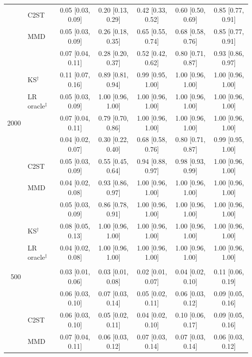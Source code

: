 \begin{tabular}{rlccccc}
 & C2ST & 0.05 [0.03, 0.09] & 0.20 [0.13, 0.29] & 0.42 [0.33, 0.52] & 0.60 [0.50, 0.69] & 0.85 [0.77, 0.91] \\
 & MMD & 0.05 [0.03, 0.09] & 0.26 [0.18, 0.35] & 0.65 [0.55, 0.74] & 0.68 [0.58, 0.76] & 0.85 [0.77, 0.91] \\
 & \SigMMD{} & 0.07 [0.04, 0.11] & 0.28 [0.20, 0.37] & 0.52 [0.42, 0.62] & 0.80 [0.71, 0.87] & 0.93 [0.86, 0.97] \\
 & KS$^{\dagger}$ & 0.11 [0.07, 0.16] & 0.89 [0.81, 0.94] & 0.99 [0.95, 1.00] & 1.00 [0.96, 1.00] & 1.00 [0.96, 1.00] \\
 & LR oracle$^{\ddagger}$ & 0.05 [0.03, 0.09] & 1.00 [0.96, 1.00] & 1.00 [0.96, 1.00] & 1.00 [0.96, 1.00] & 1.00 [0.96, 1.00] \\
2000 & \WC{} & 0.07 [0.04, 0.11] & 0.79 [0.70, 0.86] & 1.00 [0.96, 1.00] & 1.00 [0.96, 1.00] & 1.00 [0.96, 1.00] \\
 & \LRC{} & 0.04 [0.02, 0.07] & 0.30 [0.22, 0.40] & 0.68 [0.58, 0.76] & 0.80 [0.71, 0.87] & 0.99 [0.95, 1.00] \\
 & C2ST & 0.05 [0.03, 0.09] & 0.55 [0.45, 0.64] & 0.94 [0.88, 0.97] & 0.98 [0.93, 0.99] & 1.00 [0.96, 1.00] \\
 & MMD & 0.04 [0.02, 0.08] & 0.93 [0.86, 0.97] & 1.00 [0.96, 1.00] & 1.00 [0.96, 1.00] & 1.00 [0.96, 1.00] \\
 & \SigMMD{} & 0.05 [0.03, 0.09] & 0.86 [0.78, 0.91] & 1.00 [0.96, 1.00] & 1.00 [0.96, 1.00] & 1.00 [0.96, 1.00] \\
 & KS$^{\dagger}$ & 0.08 [0.05, 0.13] & 1.00 [0.96, 1.00] & 1.00 [0.96, 1.00] & 1.00 [0.96, 1.00] & 1.00 [0.96, 1.00] \\
 & LR oracle$^{\ddagger}$ & 0.04 [0.02, 0.08] & 1.00 [0.96, 1.00] & 1.00 [0.96, 1.00] & 1.00 [0.96, 1.00] & 1.00 [0.96, 1.00] \\
\addlinespace[3pt]
\multicolumn{7}{@{}l}{\emph{(d) jumps, $\vartheta$: 0, 0.25, 0.5, 0.75, 1}} \\
500 & \WC{} & 0.03 [0.01, 0.06] & 0.03 [0.01, 0.08] & 0.02 [0.01, 0.07] & 0.04 [0.02, 0.10] & 0.11 [0.06, 0.19] \\
 & \LRC{} & 0.06 [0.03, 0.10] & 0.07 [0.03, 0.14] & 0.05 [0.02, 0.11] & 0.06 [0.03, 0.12] & 0.09 [0.05, 0.16] \\
 & C2ST & 0.06 [0.03, 0.10] & 0.05 [0.02, 0.11] & 0.04 [0.02, 0.10] & 0.10 [0.06, 0.17] & 0.09 [0.05, 0.16] \\
 & MMD & 0.07 [0.04, 0.11] & 0.06 [0.03, 0.12] & 0.07 [0.03, 0.14] & 0.07 [0.03, 0.14] & 0.06 [0.03, 0.12] \\

\end{tabular}
